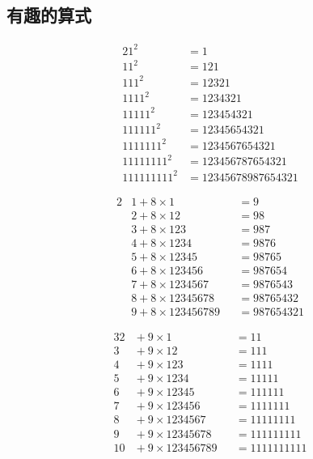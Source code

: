 \subsection{有趣的算式}
\label{sec:interesting-equations}

\begin{example}
  \begin{alignat*}{2}
    1^2 &{}= 1\\
    11^2 &{}= 121\\
    111^2 &{}= 12321\\
    1111^2 &{}= 1234321\\
    11111^2 &{}= 123454321\\
    111111^2 &{}= 12345654321\\
    1111111^2 &{}= 1234567654321\\
    11111111^2 &{}= 123456787654321\\
    111111111^2 &{}= 12345678987654321
  \end{alignat*}
\end{example}

\begin{example}
  \begin{alignat*}{2}
    &1 + 8\times 1 &{}&{}= 9\\
    &2 + 8\times 12 &{}&{}= 98\\
    &3 + 8\times 123 &{}&{}= 987\\
    &4 + 8\times 1234 &{}&{}= 9876\\
    &5 + 8\times 12345 &{}&{}= 98765\\
    &6 + 8\times 123456 &{}&{}= 987654\\
    &7 + 8\times 1234567 &{}&{}= 9876543\\
    &8 + 8\times 12345678 &{}&{}= 98765432\\
    &9 + 8\times 123456789 &{}&{}= 987654321
  \end{alignat*}
\end{example}

\begin{example}
  \begin{alignat*}{3}
    2 &{}+ 9 \times 1 &&{}= 11\\
    3 &{}+ 9 \times 12 &&{}= 111\\
    4 &{}+ 9 \times 123 &&{}= 1111\\
    5 &{}+ 9 \times 1234 &&{}= 11111\\
    6 &{}+ 9 \times 12345 &&{}= 111111\\
    7 &{}+ 9 \times 123456 &&{}= 1111111\\
    8 &{}+ 9 \times 1234567 &&{}= 11111111\\
    9 &{}+ 9 \times 12345678 &&{}= 111111111\\
    10&{}+ 9 \times 123456789 &&{}= 1111111111
  \end{alignat*}
\end{example}


